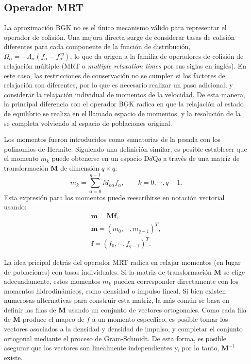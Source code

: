 \subsection{Operador MRT}

La aproximaci\'on BGK no es el \'unico mecanismo v\'alido para representar el operador de colisi\'on. Una mejora directa surge de considerar tasas de colisi\'on diferentes para cada componente de la funci\'on de distribuci\'on, $\Omega_{\alpha} = -\Lambda_{\alpha}(f_{\alpha} - f_{\alpha}^{eq})$, lo que da origen a la familia de operadores de colisi\'on de relajaci\'on m\'ultiple \cite{lallemand_theory_2000} (MRT o \emph{multiple relaxation times} por sus siglas en ingl\'es). En este caso, las restricciones de conservaci\'on no se cumplen si los factores de relajaci\'on son diferentes, por lo que es necesario realizar un paso adicional, y considerar la relajaci\'on individual de momentos de la velocidad. De esta manera, la principal diferencia con el operador BGK radica en que la relajaci\'on al estado de equilibrio se realiza en el llamado espacio de momentos, y la resoluci\'on de la \lbe{} se completa volviendo al espacio de poblaciones original.

Los momentos fueron introducidos como sumatorias de la \fdp{} pesada con los polinomios de Hermite. Siguiendo una definici\'on similar, es posible establecer que el momento $m_k$ puede obtenerse en un espacio D$d$Q$q$ a trav\'es de una matriz de transformaci\'on $\bm{M}$ de dimensi\'on $q \times q$:
\begin{equation}
	m_k = \sum_{\alpha=0}^{q-1}M_{k\alpha}f_{\alpha}, \qquad  k=0,\cdots, q-1.
\end{equation}
Esta expresi\'on para los momentos puede reescribirse en notaci\'on vectorial usando:
\begin{equation}
	\begin{gathered}
		\bm{m}=\bm{Mf}, \\
		\bm{m} = (m_0, \cdots, m_{q-1})^T, \\
		\bm{f} = (f_0, \cdots, f_{q-1})^T.
	\end{gathered}
\end{equation}

La idea pricipal detr\'as del operador MRT radica en relajar momentos (en lugar de poblaciones) con tasas individuales. Si la matriz de transformaci\'on $\bm{M}$ se elige adecuadamente, estos momentos $m_k$ pueden corresponder directamente con los momentos hidrodin\'amicos, como densidad o impulso lineal. Si bien existen numerosas alternativas para construir esta matriz, la m\'as com\'un se basa en definir las filas de $\bm{M}$ usando un conjunto de vectores ortogonales. Como cada fila de $\bm{M}$ produce el mapeo de $f$ a un momento espec\'ifico, es posible tomar los vectores asociados a la densidad y densidad de impulso, y completar el conjunto ortogonal mediante el proceso de Gram-Schmidt. De esta forma, es posible asegurar que los vectores son linealmente independientes y, por lo tanto, $\bm{M}^{-1}$ existe.

